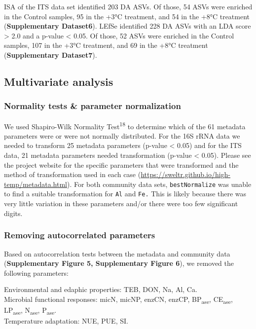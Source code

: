 \documentclass[
  10pt,
  letterpaper,
  DIV=11,
  numbers=noendperiod]{scrartcl}
\begin{document}
ISA of the ITS data set identified 203 DA ASVs. Of those, 54 ASVs were
enriched in the Control samples, 95 in the +3°C treatment, and 54 in the
+8°C treatment (\textbf{Supplementary Dataset6}). LEfSe identified 228
DA ASVs with an LDA score \textgreater{} 2.0 and a p-value \textless{}
0.05. Of those, 52 ASVs were enriched in the Control samples, 107 in the
+3°C treatment, and 69 in the +8°C treatment (\textbf{Supplementary
Dataset7}).

\hypertarget{multivariate-analysis-1}{%
\subsection{Multivariate analysis}\label{multivariate-analysis-1}}

\hypertarget{normality-tests-parameter-normalization}{%
\subsubsection{Normality tests \& parameter
normalization}\label{normality-tests-parameter-normalization}}

We used Shapiro-Wilk Normality Test\textsuperscript{18} to determine
which of the 61 metadata parameters were or were not normally
distributed. For the 16S rRNA data we needed to transform 25 metadata
parameters (p-value \textless{} 0.05) and for the ITS data, 21 metadata
parameters needed transformation (p-value \textless{} 0.05). Please see
the project website for the specific parameters that were transformed
and the method of transformation used in each case
(\url{https://sweltr.github.io/high-temp/metadata.html}). For both
community data sets, \texttt{bestNormalize} was unable to find a
suitable transformation for \texttt{Al} and \texttt{Fe.} This is likely
because there was very little variation in these parameters and/or there
were too few significant digits.

\hypertarget{removing-autocorrelated-parameters}{%
\subsubsection{Removing autocorrelated
parameters}\label{removing-autocorrelated-parameters}}

Based on autocorrelation tests between the metadata and community data
(\textbf{Supplementary Figure 5, Supplementary Figure 6}), we removed
the following parameters:

Environmental and edaphic properties: TEB, DON, Na, Al, Ca.\\
Microbial functional responses: micN, micNP, enzCN, enzCP,
BP\textsubscript{ase}, CE\textsubscript{ase}, LP\textsubscript{ase},
N\textsubscript{ase}, P\textsubscript{ase}.\\
Temperature adaptation: NUE, PUE, SI.
\end{document}
